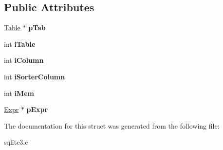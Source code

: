 \subsection*{Public Attributes}
\begin{DoxyCompactItemize}
\item 
\hyperlink{structTable}{Table} $\ast$ {\bfseries p\+Tab}\hypertarget{structAggInfo_1_1AggInfo__col_ad2f2ae137b49e72d28a57accc9d06386}{}\label{structAggInfo_1_1AggInfo__col_ad2f2ae137b49e72d28a57accc9d06386}

\item 
int {\bfseries i\+Table}\hypertarget{structAggInfo_1_1AggInfo__col_ab49aa2fbfc6278c86b64497a6807c113}{}\label{structAggInfo_1_1AggInfo__col_ab49aa2fbfc6278c86b64497a6807c113}

\item 
int {\bfseries i\+Column}\hypertarget{structAggInfo_1_1AggInfo__col_a4cad2ce99ddf7425d358d49e40524f6b}{}\label{structAggInfo_1_1AggInfo__col_a4cad2ce99ddf7425d358d49e40524f6b}

\item 
int {\bfseries i\+Sorter\+Column}\hypertarget{structAggInfo_1_1AggInfo__col_ae3901ad0d5b6d519a7559358f1f7248b}{}\label{structAggInfo_1_1AggInfo__col_ae3901ad0d5b6d519a7559358f1f7248b}

\item 
int {\bfseries i\+Mem}\hypertarget{structAggInfo_1_1AggInfo__col_ae22f3dfc6f9c2dc647be1b9fbd14e896}{}\label{structAggInfo_1_1AggInfo__col_ae22f3dfc6f9c2dc647be1b9fbd14e896}

\item 
\hyperlink{structExpr}{Expr} $\ast$ {\bfseries p\+Expr}\hypertarget{structAggInfo_1_1AggInfo__col_a60f23ec0abfcc88cab7083967a3abd9e}{}\label{structAggInfo_1_1AggInfo__col_a60f23ec0abfcc88cab7083967a3abd9e}

\end{DoxyCompactItemize}


The documentation for this struct was generated from the following file\+:\begin{DoxyCompactItemize}
\item 
sqlite3.\+c\end{DoxyCompactItemize}
